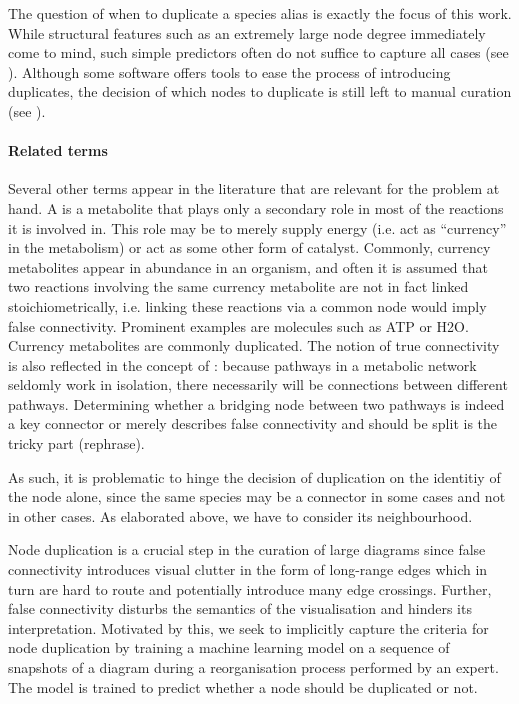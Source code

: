 \documentclass[
	fontsize=10pt, %
	twoside=false, %
	secnumdepth=1, %
]{kaobook}
\begin{document}
The question of when to duplicate a species alias is exactly the focus of this
work. While structural features such as an extremely large node degree
immediately come to mind, such simple predictors often do not suffice to capture
all cases (see ).
Although some software offers
tools to ease the process of introducing duplicates, the decision of which nodes
to duplicate is still left to manual curation (see ).


\paragraph{Related terms}
Several other terms appear in the literature that are relevant for the problem
at hand. A 
\cite{huss_CurrencyCommodityMetabolites_2007}
is a metabolite that plays only a secondary
role in most of the reactions it is involved in. This role may be to merely
supply energy (i.e. act as ``currency'' in the metabolism) or act as some other
form of catalyst. Commonly, currency metabolites appear in abundance in an
organism, and often it is assumed that two reactions involving the same currency
metabolite are not in fact linked stoichiometrically, i.e. linking these
reactions via a common node would imply false connectivity. Prominent examples
are molecules such as ATP or H2O. Currency metabolites are commonly
duplicated.
The notion of true connectivity is also reflected in the concept of  \cite{kim_IdentificationCriticalConnectors_2019}: because pathways
in a metabolic network seldomly work in isolation, there necessarily will be
connections between different pathways. Determining whether a bridging node
between two pathways is indeed a key connector or merely describes false
connectivity and should be split is the tricky part (rephrase).

As such, it is problematic to hinge the decision of duplication on the identitiy
of the node alone, since the same species may be a connector in some cases and
not in other cases. As elaborated above, we have to consider its neighbourhood.

Node duplication is a crucial step in the curation of large diagrams since false
connectivity introduces visual clutter in the form of long-range edges which in
turn are hard to route and potentially introduce many edge crossings. Further,
false connectivity disturbs the semantics of the visualisation and hinders its
interpretation.
Motivated by this, we seek to implicitly capture the criteria for node
duplication by training a machine learning model on a sequence of snapshots of a
diagram during a reorganisation process performed by an expert. The model is
trained to predict whether a node should be duplicated or not.
\end{document}
